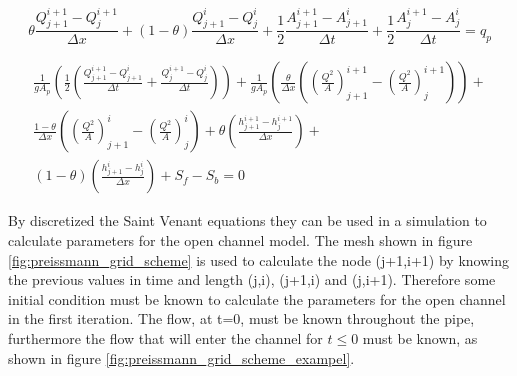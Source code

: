 \begin{equation}\label{eq:continuity_eq_preissmann}
	\theta \frac{Q_{j+1}^{i+1}-Q_j^{i+1}}{\Delta x}+(1-\theta)\frac{Q_{j+1}^i - Q_j^i}{\Delta x}+
	\frac{1}{2}\frac{A_{j+1}^{i+1}-A_{j+1}^i}{\Delta t} + \frac{1}{2} \frac{A_{j}^{i+1} - A_j^i}{\Delta t} = q_p
\end{equation}

\begin{multline}
	\frac{1}{gA_p}\left(\frac{1}{2} \left(\frac{Q_{j+1}^{i+1}-Q_{j+1}^i}{\Delta t}+\frac{Q_{j}^{i+1} - Q_j^i}{\Delta t}\right)\right) + \frac{1}{gA_p}\left(\frac{\theta}{\Delta x} \left(\left(\frac{Q^2}{A}\right)_{j+1}^{i+1}-\left(\frac{Q^2}{A}\right)_{j}^{i+1}\right)\right) + \\ \frac{1-\theta}{\Delta x}\left(\left(\frac{Q^2}{A}\right)_{j+1}^{i}-\left(\frac{Q^2}{A}\right)_{j}^{i}\right)+\theta \left(\frac{h_{j+1}^{i+1}-h_j^{i+1}}{\Delta x}\right)+ \\ (1-\theta)\left(\frac{h_{j+1}^{i} - h_j^i}{\Delta x}\right)+S_f-S_b= 0
\end{multline}

By discretized the Saint Venant equations they can be used in a simulation to calculate parameters for the open channel model. The mesh shown in figure \ref{fig:preissmann_grid_scheme} is used to calculate the node (j+1,i+1) by knowing the previous values in time and length (j,i), (j+1,i) and (j,i+1). Therefore some initial condition must be known to calculate the parameters for the open channel in the first iteration. The flow, at t=0, must be known throughout the pipe, furthermore the flow that will enter the channel for $t\leq 0$ must be known, as shown in figure \ref{fig:preissmann_grid_scheme_exampel}.


